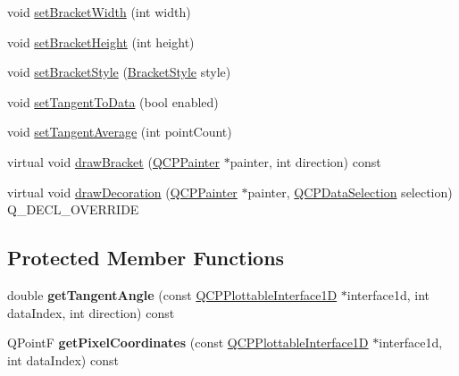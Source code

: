 \begin{DoxyCompactItemize}
\item 
void \hyperlink{classQCPSelectionDecoratorBracket_a291b59cab98ce93a0a3c85963fe10f5e}{set\+Bracket\+Width} (int width)
\item 
void \hyperlink{classQCPSelectionDecoratorBracket_aed773ad737201cca40efc6fe451acad8}{set\+Bracket\+Height} (int height)
\item 
void \hyperlink{classQCPSelectionDecoratorBracket_a04507697438f6ad8cc2aeea5422dcbe5}{set\+Bracket\+Style} (\hyperlink{classQCPSelectionDecoratorBracket_aa6d18517ec0553575bbef0de4252336e}{Bracket\+Style} style)
\item 
void \hyperlink{classQCPSelectionDecoratorBracket_a93bc6086e53a5e40a08641a7b2e2cdd5}{set\+Tangent\+To\+Data} (bool enabled)
\item 
void \hyperlink{classQCPSelectionDecoratorBracket_adb2d0876f25a77c88042b70818f1d6e4}{set\+Tangent\+Average} (int point\+Count)
\item 
virtual void \hyperlink{classQCPSelectionDecoratorBracket_a57b65b5508d5bd0f27c9318f3d4646be}{draw\+Bracket} (\hyperlink{classQCPPainter}{Q\+C\+P\+Painter} $\ast$painter, int direction) const
\item 
virtual void \hyperlink{classQCPSelectionDecoratorBracket_a9ebe2e729b5012c0a995d788f87fac22}{draw\+Decoration} (\hyperlink{classQCPPainter}{Q\+C\+P\+Painter} $\ast$painter, \hyperlink{classQCPDataSelection}{Q\+C\+P\+Data\+Selection} selection) Q\+\_\+\+D\+E\+C\+L\+\_\+\+O\+V\+E\+R\+R\+I\+DE
\end{DoxyCompactItemize}
\subsection*{Protected Member Functions}
\begin{DoxyCompactItemize}
\item 
\mbox{\label{classQCPSelectionDecoratorBracket_ac002e20586950bf5c91a399863769c61}} 
double {\bfseries get\+Tangent\+Angle} (const \hyperlink{classQCPPlottableInterface1D}{Q\+C\+P\+Plottable\+Interface1D} $\ast$interface1d, int data\+Index, int direction) const
\item 
\mbox{\label{classQCPSelectionDecoratorBracket_a9925ed667e8a645fcb9949bd02ee4a19}} 
Q\+PointF {\bfseries get\+Pixel\+Coordinates} (const \hyperlink{classQCPPlottableInterface1D}{Q\+C\+P\+Plottable\+Interface1D} $\ast$interface1d, int data\+Index) const
\end{DoxyCompactItemize}
